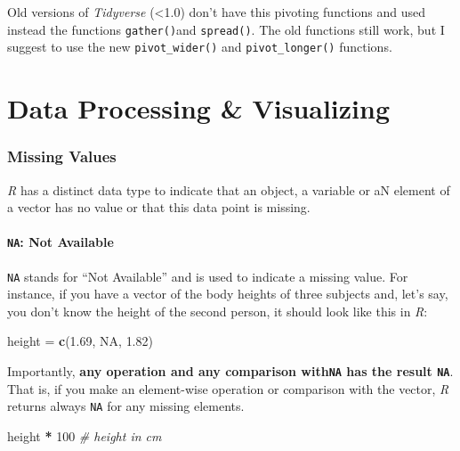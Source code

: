 \documentclass[
]{scrartcl}
\makeatletter
\newenvironment{Shaded}{\begin{snugshade}}{\end{snugshade}}
\newcommand{\CommentTok}[1]{\textcolor[rgb]{0.56,0.35,0.01}{\textit{#1}}}
\newcommand{\ConstantTok}[1]{\textcolor[rgb]{0.56,0.35,0.01}{#1}}
\newcommand{\DecValTok}[1]{\textcolor[rgb]{0.00,0.00,0.81}{#1}}
\newcommand{\FloatTok}[1]{\textcolor[rgb]{0.00,0.00,0.81}{#1}}
\newcommand{\FunctionTok}[1]{\textcolor[rgb]{0.13,0.29,0.53}{\textbf{#1}}}
\newcommand{\NormalTok}[1]{#1}
\newcommand{\OtherTok}[1]{\textcolor[rgb]{0.56,0.35,0.01}{#1}}
\newcommand{\SpecialCharTok}[1]{\textcolor[rgb]{0.81,0.36,0.00}{\textbf{#1}}}
\newenvironment{kframe}{%
\medskip{}
\setlength{\fboxsep}{.8em}
 \def\at@end@of@kframe{}%
 \ifinner\ifhmode%
  \def\at@end@of@kframe{\end{minipage}}%
  \begin{minipage}{\columnwidth}%
 \fi\fi%
 \def\FrameCommand##1{\hskip\@totalleftmargin \hskip-\fboxsep
 \colorbox{shadecolor}{##1}\hskip-\fboxsep
     \hskip-\linewidth \hskip-\@totalleftmargin \hskip\columnwidth}%
 \MakeFramed {\advance\hsize-\width
   \@totalleftmargin\z@ \linewidth\hsize
   \@setminipage}}%
 {\par\unskip\endMakeFramed%
 \at@end@of@kframe}
\newenvironment{rmdblock}[1]
  {
  \begin{itemize}
  \renewcommand{\labelitemi}{
    \raisebox{-.7\height}[0pt][0pt]{
      {\setkeys{Gin}{width=3em,keepaspectratio}\texttt{[image: images/\#1]}}
    }
  }
  \setlength{\fboxsep}{1em}
  \begin{kframe}
  \item
  }
  {
  \end{kframe}
  \end{itemize}
  }
\newenvironment{geek}
    {\begin{rmdblock}{geek}}
    {\end{rmdblock}}
\makeatother
\begin{document}
\begin{geek}
Old versions of \emph{Tidyverse} (\textless1.0) don't have this pivoting
functions and used instead the functions \texttt{gather()}and
\texttt{spread()}. The old functions still work, but I suggest to use
the new \texttt{pivot\_wider()} and \texttt{pivot\_longer()} functions.
\end{geek}

\newpage

\part{Data Processing \& Visualizing}\label{part-data-processing-visualizing}

\section{Missing Values}\label{missing-values}

\emph{R} has a distinct data type to indicate that an object, a variable or aN element of a vector has no value or that this data point is missing.

\subsection{\texorpdfstring{\texttt{NA}: Not Available}{NA: Not Available}}\label{na-not-available}

\texttt{NA} stands for ``Not Available'' and is used to indicate a missing value. For instance, if you have a vector of the body heights of three subjects and, let's say, you don't know the height of the second person, it should look like this in \emph{R}:

\begin{Shaded}
\begin{Highlighting}[]
\NormalTok{height }\OtherTok{=} \FunctionTok{c}\NormalTok{(}\FloatTok{1.69}\NormalTok{, }\ConstantTok{NA}\NormalTok{, }\FloatTok{1.82}\NormalTok{)}
\end{Highlighting}
\end{Shaded}

Importantly, \textbf{any operation and any comparison with\texttt{NA} has the result \texttt{NA}}. That is, if you make an element-wise operation or comparison with the vector, \emph{R} returns always \texttt{NA} for any missing elements.

\begin{Shaded}
\begin{Highlighting}[]
\NormalTok{height }\SpecialCharTok{*} \DecValTok{100}  \CommentTok{\# height in cm}
\end{Highlighting}
\end{Shaded}
\end{document}
